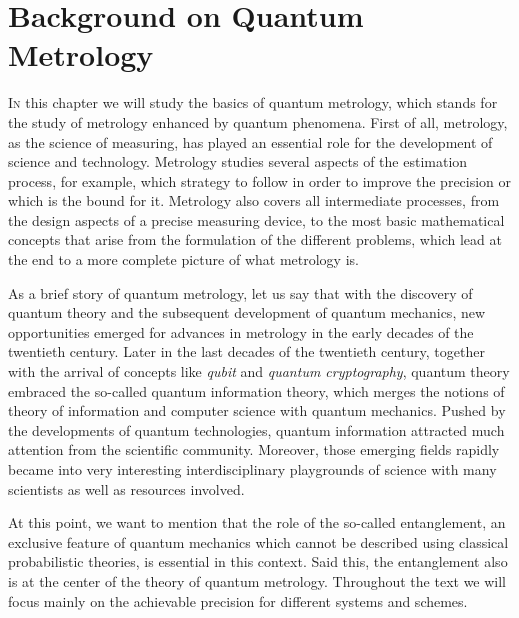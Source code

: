 \section[Backgroud on Quantum Metrology]
{Background on Quantum Metrology}



\vspace{0pt}
\lettrine[lines=2, findent=3pt,nindent=0pt]{I}{n} this chapter we will study the basics of quantum metrology, which stands for the study of metrology enhanced by quantum phenomena.
First of all, metrology, as the science of measuring, has played an essential role for the development of science and technology.
Metrology studies several aspects of the estimation process, for example, which strategy to follow in order to improve the precision or which is the bound for it.
Metrology also covers all intermediate processes, from the design aspects of a precise measuring device, to the most basic mathematical concepts that arise from the formulation of the different problems, which lead at the end to a more complete picture of what metrology is.

As a brief story of quantum metrology, let us say that with the discovery of quantum theory and the subsequent development of quantum mechanics, new opportunities emerged for advances in metrology in the early decades of the twentieth century.
Later in the last decades of the twentieth century, together with the arrival of concepts like \emph{qubit} and \emph{quantum cryptography}, quantum theory embraced the so-called quantum information theory, which merges the notions of theory of information and computer science with quantum mechanics.
Pushed by the developments of quantum technologies, quantum information attracted much attention from the scientific community.
Moreover, those emerging fields rapidly became into very interesting interdisciplinary playgrounds of science with many scientists as well as resources involved.

At this point, we want to mention that the role of the so-called entanglement, an exclusive feature of quantum mechanics which cannot be described using classical probabilistic theories, is essential in this context.
Said this, the entanglement also is at the center of the theory of quantum metrology.
Throughout the text we will focus mainly on the achievable precision for different systems and schemes.

